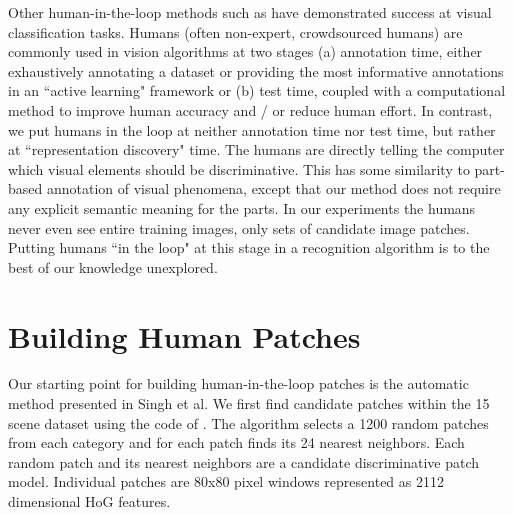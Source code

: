 \documentclass[10pt,twocolumn,letterpaper]{article}
\begin{document}
Other human-in-the-loop methods such as \cite{gingold2012micro, branson2010visual, kovashka2012whittlesearch} have demonstrated success at visual classification tasks. Humans (often non-expert, crowdsourced humans) are commonly used in vision algorithms at two stages (a) annotation time, either exhaustively annotating a dataset or providing the most informative annotations in an ``active learning" framework or (b) test time, coupled with a computational method to improve human accuracy and / or reduce human effort. In contrast, we put humans in the loop at neither annotation time nor test time, but rather at ``representation discovery" time. The humans are directly telling the computer which visual elements should be discriminative. This has some similarity to part-based annotation of visual phenomena, except that our method does not require any explicit semantic meaning for the parts. In our experiments the humans never even see entire training images, only sets of candidate image patches. Putting humans ``in the loop" at this stage in a recognition algorithm is to the best of our knowledge unexplored.

\section{Building Human Patches}
%
%

Our starting point for building human-in-the-loop patches is the automatic method presented in Singh et al. We first find candidate patches within the 15 scene dataset \cite{lazebnik2006beyond} using the code of \cite{singh2012unsupervised, doersch2012makes}. The algorithm selects a 1200 random patches from each category and for each patch finds its 24 nearest neighbors. Each random patch and its nearest neighbors are a candidate discriminative patch model. Individual patches are 80x80 pixel windows represented as 2112 dimensional HoG features.
\end{document}
